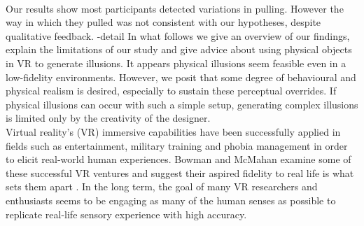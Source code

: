 \\
Our results show most participants detected variations in pulling. However the way in which they pulled was not consistent with our hypotheses, despite qualitative feedback. -detail In what follows we give an overview of our findings, explain the limitations of our study and give advice about using physical objects in VR to generate illusions. It appears physical illusions seem feasible even in a low-fidelity environments. However, we posit that some degree of behavioural and physical realism is desired, especially to sustain these perceptual overrides. If physical illusions can occur with such a simple setup, generating complex illusions is limited only by the creativity of the designer.
\\
Virtual reality's (VR) immersive capabilities have been successfully applied in fields such as entertainment, military training and phobia management in order to elicit real-world human experiences. Bowman and McMahan examine some of these successful VR ventures and suggest their aspired fidelity to real life is what sets them apart \cite{bowman2007virtual}. In the long term, the goal of many VR researchers and enthusiasts seems to be engaging as many of the human senses as possible to replicate real-life sensory experience with high accuracy.